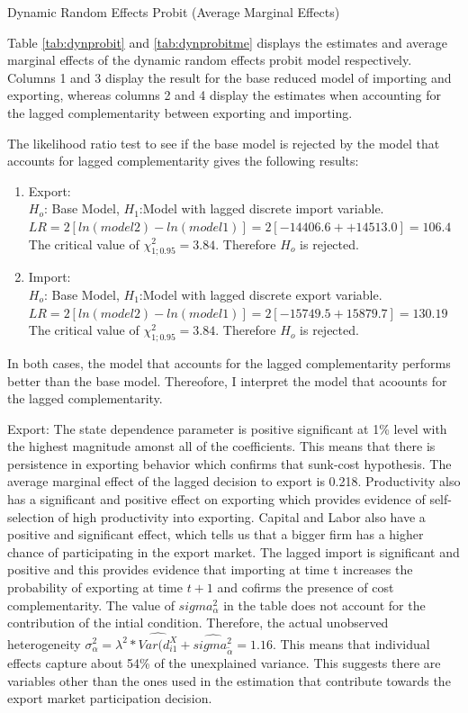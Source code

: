 \documentclass[11pt]{article}
\begin{document}
\begin{center}
\begin{table}[H]
\caption{Dynamic Random Effects Probit (Average Marginal Effects)}
\label{tab:dynprobitme}

\end{table}
\end{center}

Table \ref{tab:dynprobit} and \ref{tab:dynprobitme} displays the
estimates and average marginal effects of the dynamic random
effects probit model respectively. Columns 1 and 3 display the result for the base
reduced model of importing and exporting, whereas columns 2 and 4
display the estimates when accounting for the lagged complementarity
between exporting and importing.

The likelihood ratio test to see if the base model is rejected by the
model that accounts for lagged complementarity gives the following
results:
\begin{enumerate}
\item Export: \\$H_{o}$: Base Model, $H_{1}$:Model with lagged discrete
  import variable.
$LR= 2[ln(model2) - ln(model1)] = 2[-14406.6 + +14513.0] = 106.4$
The critical value of $\chi^{2}_{1;0.95}= 3.84 $. Therefore $H_{o}$ is
rejected. 
\item Import:\\ $H_{o}$: Base Model, $H_{1}$:Model with lagged discrete
  export variable. 
$LR= 2[ln(model2) - ln(model1)] = 2[-15749.5 + 15879.7 ] = 130.19$
The critical value of $\chi^{2}_{1;0.95}= 3.84 $. Therefore $H_{o}$ is
rejected. 
\end{enumerate}
In both cases, the model that accounts for the lagged complementarity
performs better than the base model. Thereofore, I interpret the model
that acoounts for the lagged complementarity. 
 

 Export: The state dependence parameter is positive
  significant at 1\% level with the highest magnitude amonst all of
  the coefficients. This means that there is persistence in
  exporting behavior which confirms that sunk-cost hypothesis. The average marginal effect of the lagged
  decision to export is 0.218. Productivity also has a significant and
  positive effect on exporting which provides evidence of
  self-selection of high productivity into exporting. Capital and Labor
  also have a positive and significant effect, which tells us that a
  bigger firm has a higher chance of participating in the export
  market. The lagged import is
  significant and positive and this provides evidence  that importing
  at time t increases the probability of exporting at time $t+1$ and
  cofirms the presence of cost complementarity.  The value of
  $sigma^2_{\alpha}$ in the table does not account for the
  contribution of the intial condition. Therefore, the actual 
  unobserved heterogeneity $\sigma^2_{\alpha}= \lambda^2 *
  \hat{Var(d_{i1}^{X}} + \hat{sigma^2_{\tilde{\alpha}}}= 1.16$. This
  means that individual effects capture  about 54\% of the unexplained
  variance. This suggests there are variables other than the ones used
  in the estimation that contribute towards the export market
  participation decision. 
\end{document}
